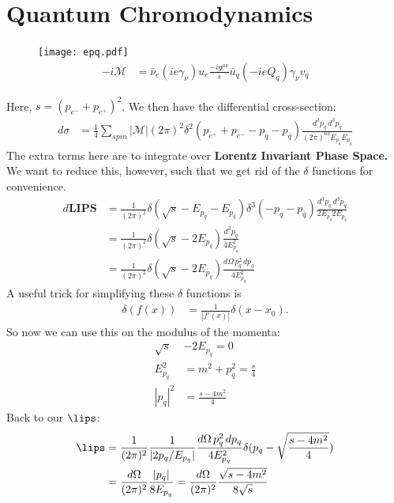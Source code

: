 \documentclass[relqm.tex]{subfiles}
\begin{document}
\chapter{Quantum Chromodynamics}
\begin{figure}[H]
    \centering
    \texttt{[image: epq.pdf]}
    \begin{align}
        -i\mathcal{M} &= \bar{\nu}_e(ie\gamma_\nu)u_e\frac{-ig^{\mu\nu}}{s}\bar{u}_q(-ieQ_{q})\gamma_\nu v_q
    \end{align}
    \vspace{-40pt}
\end{figure}
Here, $s = (p_{e^-} + p_{e^+})^2$. 
We then have the differential cross-section:
\begin{align}
    d\sigma &= \frac14\sum_{spin} |\mathcal{M}| (2\pi)^2 \delta^2(p_{e^+}+p_{e^-}-p_{q}-p_{\bar{q}}) \frac{d^3p_q\,d^3p_{\bar{q}}}{(2\pi)^62E_{p_q}E_{p_{\bar{q}}}}
\end{align}
The extra terms here are to integrate over \textbf{Lorentz Invariant Phase Space.}
We want to reduce this, however, such that we get rid of the $\delta$ functions for convenience. 
\begin{align}
    d\textbf{LIPS} &= \frac{1}{(2\pi)^2} \delta(\sqrt{s}-E_{p_q}-E_{p_{\bar{q}}})\delta^3(-p_{q}-p_{\bar{q}}) \frac{d^3p_q\,d^3p_{\bar{q}}}{2E_{p_q}2E_{p_{\bar{q}}}} \\
                 &= \frac{1}{(2\pi)^2} \delta(\sqrt{s}-2E_{p_q})\frac{d^3p_{q}}{4E_{p_q}^2} \\
                 &= \frac{1}{(2\pi)^2} \delta(\sqrt{s}-2E_{p_q})\frac{d\Omega\,p_q^2\,dp_q}{4E_{p_q}^2}
\end{align}
A useful trick for simplifying these $\delta$ functions is
\begin{align}
    \delta(f(x)) &= \frac{1}{|f'(x)|}\delta(x-x_0).
\end{align}
So now we can use this on the modulus of the momenta:
\begin{align}
    \sqrt{s} &- 2E_{p_q} = 0 \\
    E_{p_q}^2 &= m^2 + p_q^2 = \frac{s}{4} \\
    |p_q|^2 &= \frac{s-4m^2}{4}
\end{align}
Back to our $\lips$:
\begin{align}
    \lips &= \frac{1}{(2\pi)^2} \frac{1}{|2p_q/E_{p_q}|} \frac{d\Omega\, p_q^2\,dp_q}{4E_{p_q}^2} \delta(p_q-\sqrt{\frac{s-4m^2}{4}}) \\
          &= \frac{d\Omega}{(2\pi)^2}\frac{|p_q|}{8E_{p_q}} = \frac{d\Omega}{(2\pi)^2}\frac{\sqrt{s-4m^2}}{8\sqrt{s}}
\end{align}
\end{document}
